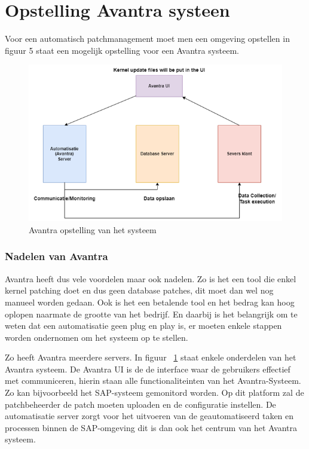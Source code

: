 \documentclass[dutch,dit,thesis]{hogentreport}
\begin{document}
\section{Opstelling Avantra systeen}
Voor een automatisch patchmanagement moet men een omgeving opstellen in figuur 5 staat een mogelijk opstelling voor een Avantra systeem. 
\begin{figure}[htbp]
    \centering
    \includegraphics[width=\textwidth]{avantra4.png}
    \caption{Avantra opstelling van het systeem}
     \label{fig:avantra4}
\end{figure}

\subsubsection{Nadelen van Avantra}
Avantra heeft dus vele voordelen maar ook nadelen. Zo is het een tool die enkel kernel patching doet en dus geen database patches, dit moet dan wel nog manueel worden gedaan. Ook is het een betalende tool en het bedrag kan hoog oplopen naarmate de grootte van het bedrijf.
En daarbij is het belangrijk om te weten dat een automatisatie geen plug en play is, er moeten enkele stappen worden ondernomen om het systeem op te stellen.

Zo heeft Avantra meerdere servers. In figuur ~\ref{fig:avantra4} staat enkele onderdelen van het Avantra systeem. De Avantra UI is de de interface waar de gebruikers effectief met communiceren, hierin staan alle functionaliteinten van het Avantra-Systeem. Zo kan bijvoorbeeld het SAP-systeem gemonitord worden. Op
dit platform zal de patchbeheerder de patch moeten uploaden en de configuratie instellen. De automatisatie server zorgt voor het uitvoeren van de geautomatiseerd taken en processen binnen de SAP-omgeving dit is dan ook het centrum van het Avantra systeem.
\end{document}

